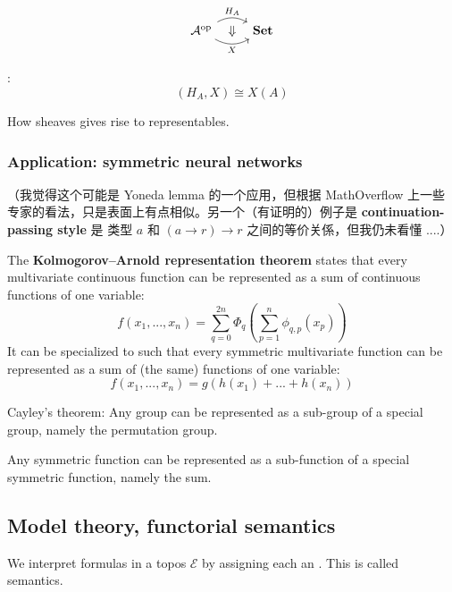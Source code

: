 \begin{equation}
\begin{tikzcd}
\mathcal{A}^{\mathrm{op}} 
\arrow[r, bend left=30, "H_A"]
\arrow[r, bend right=30, swap, "X"]
\arrow[r, phantom, "\Downarrow"]
& \mathbf{Set}
\end{tikzcd}
\end{equation}

:
\begin{equation}
[\mathcal{A}^{\mathrm{op}} , \mathbf{Set}] (H_A, X) \cong X(A)
\end{equation}

How sheaves gives rise to representables.

\subsubsection{Application: symmetric neural networks}

（我觉得这个可能是 Yoneda lemma 的一个应用，但根据 MathOverflow 上一些专家的看法，只是表面上有点相似。另一个（有证明的）例子是 \textbf{continuation-passing style} 是 类型 $a$ 和 $(a \rightarrow r) \rightarrow r$ 之间的等价关係，但我仍未看懂 ....）

The \textbf{Kolmogorov–Arnold representation theorem} states that every multivariate continuous function can be represented as a sum of continuous functions of one variable:
\begin{equation}
f(x_1,... ,x_n) = \sum_{q=0}^{2n}\Phi_{q} \left(\sum_{p=1}^n \phi_{q,p}(x_p) \right)
\end{equation}
It can be specialized to such that every symmetric multivariate function can be represented as a sum of (the same) functions of one variable:
\begin{equation}
\label{symmetric-functions}
f(x_1, ..., x_n) = g(h(x_1) + ... + h(x_n))
\end{equation}

Cayley's theorem:  Any group can be represented as a sub-group of a special group, namely the permutation group.

Any symmetric function can be represented as a sub-function of a special symmetric function, namely the sum.

\subsection{Model theory, functorial semantics}

We interpret formulas in a topos $\mathcal{E}$ by assigning each an .  This is called  semantics.

